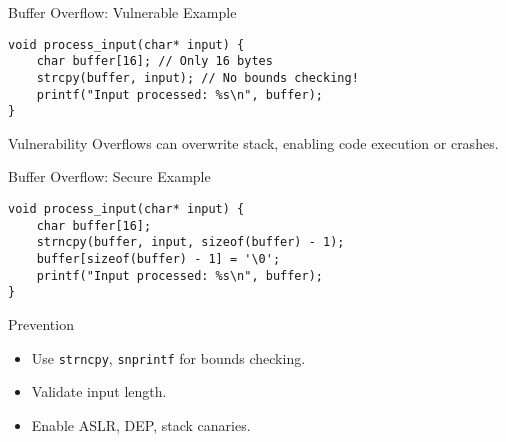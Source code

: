 \documentclass[12pt]{beamer}
\begin{document}
\begin{frame}[fragile]{Buffer Overflow: Vulnerable Example}
  \begin{lstlisting}[style=cppstyle]
void process_input(char* input) {
    char buffer[16]; // Only 16 bytes
    strcpy(buffer, input); // No bounds checking!
    printf("Input processed: %s\n", buffer);
}
  \end{lstlisting}
  \begin{alertblock}{Vulnerability}
    Overflows can overwrite stack, enabling code execution or crashes.
  \end{alertblock}
\end{frame}

\begin{frame}[fragile]{Buffer Overflow: Secure Example}
  \begin{lstlisting}[style=cppstyle]
void process_input(char* input) {
    char buffer[16];
    strncpy(buffer, input, sizeof(buffer) - 1);
    buffer[sizeof(buffer) - 1] = '\0';
    printf("Input processed: %s\n", buffer);
}
  \end{lstlisting}
  \begin{block}{Prevention}
    \begin{itemize}
      \item Use \texttt{strncpy}, \texttt{snprintf} for bounds checking.
      \item Validate input length.
      \item Enable ASLR, DEP, stack canaries.
    \end{itemize}
  \end{block}
\end{frame}
\end{document}
